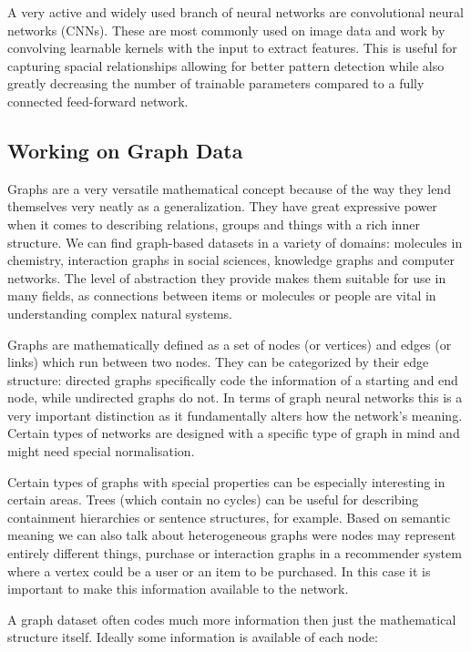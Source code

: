 	A very active and widely used branch of neural networks are convolutional neural networks (CNNs). These are most commonly used on image data and work by convolving learnable kernels with the input to extract features. This is useful for capturing spacial relationships allowing for better pattern detection while also greatly decreasing the number of trainable parameters compared to a fully connected feed-forward network.
	
	
	\subsection{Working on Graph Data}
	
	Graphs are a very versatile mathematical concept because of the way they lend themselves very neatly as a generalization. They have great expressive power when it comes to describing relations, groups and things with a rich inner structure. We can find graph-based datasets in a variety of domains: molecules in chemistry, interaction graphs in social sciences, knowledge graphs and computer networks. The level of abstraction they provide makes them suitable for use in many fields, as connections between items or molecules or people are vital in understanding complex natural systems.
	
	Graphs are mathematically defined as a set of nodes (or vertices) and edges (or links) which run between two nodes. They can be categorized by their edge structure: directed graphs specifically code the information of a starting and end node, while undirected graphs do not. In terms of graph neural networks this is a very important distinction as it fundamentally alters how the network's meaning. Certain types of networks are designed with a specific type of graph in mind and might need special normalisation.
	
	Certain types of graphs with special properties can be especially interesting in certain areas. Trees (which contain no cycles) can be useful for describing containment hierarchies or sentence structures, for example. Based on semantic meaning we can also talk about heterogeneous graphs were nodes may represent entirely different things, purchase or interaction graphs in a recommender system where a vertex could be a user or an item to be purchased. In this case it is important to make this information available to the network.
	
	A graph dataset often codes much more information then just the mathematical structure itself. Ideally some information is available of each node: 
	
